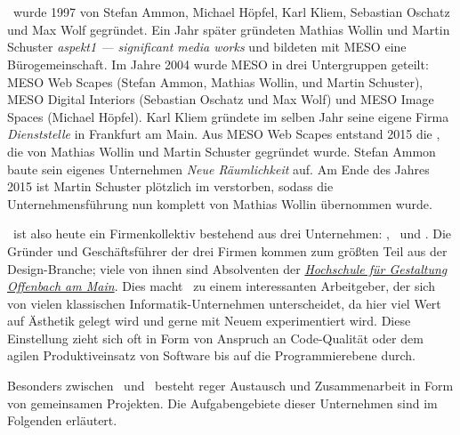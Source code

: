 \section{\meso}
\label{sec:e-meso}

\meso~wurde 1997 von Stefan Ammon, Michael Höpfel, Karl Kliem, Sebastian
Oschatz und Max Wolf gegründet. Ein Jahr später gründeten Mathias Wollin und
Martin Schuster \emph{aspekt1 --- significant media works} und bildeten mit
MESO eine Bürogemeinschaft.  Im Jahre 2004 wurde MESO in drei Untergruppen
geteilt: MESO Web Scapes (Stefan Ammon, Mathias Wollin, und Martin Schuster),
MESO Digital Interiors (Sebastian Oschatz und Max Wolf) und MESO Image Spaces
(Michael Höpfel). Karl Kliem gründete im selben Jahr seine eigene Firma
\emph{Dienststelle} in Frankfurt am Main.  Aus MESO Web Scapes entstand 2015
die \mesods, die von Mathias Wollin und Martin Schuster gegründet wurde.
Stefan Ammon baute sein eigenes Unternehmen \emph{Neue Räumlichkeit} auf.  Am
Ende des Jahres 2015 ist Martin Schuster plötzlich im verstorben, sodass die
Unternehmensführung nun komplett von Mathias Wollin übernommen wurde.

\meso~ist also heute ein Firmenkollektiv bestehend aus drei Unternehmen:
\mesodi, \mesods~und \mesois.  Die Gründer und Geschäftsführer der drei Firmen
kommen zum größten Teil aus der Design-Branche; viele von ihnen sind
Absolventen der \emph{\href{http://hfg-offenbach.de}{%
Hochschule für Gestaltung Offenbach am Main}}.  Dies macht \meso~zu einem
interessanten Arbeitgeber, der sich von vielen klassischen
Informatik-Unternehmen unterscheidet, da hier viel Wert auf Ästhetik gelegt
wird und gerne mit Neuem experimentiert wird.  Diese Einstellung zieht sich oft
in Form von Anspruch an Code-Qualität oder dem agilen Produktiveinsatz von
Software bis auf die Programmierebene durch.

Besonders zwischen \mesodi~und \mesods~besteht reger Austausch und
Zusammenarbeit in Form von gemeinsamen Projekten.  Die Aufgabengebiete dieser
Unternehmen sind im Folgenden erläutert.



